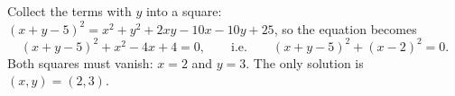 Collect the terms with $y$ into a square: $(x+y-5)^2=x^2+y^2+2xy-10x-10y+25$, so the equation becomes
\[
(x+y-5)^2+x^2-4x+4=0,\qquad\text{i.e.}\qquad(x+y-5)^2+(x-2)^2=0 .
\]
Both squares must vanish: $x=2$ and $y=3$. The only solution is $\boxed{(x,y)=(2,3)}$.
